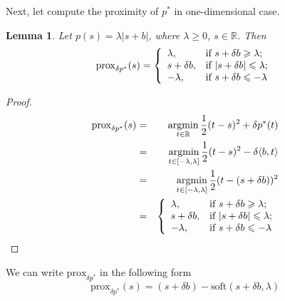 \documentclass[preprint]{elsarticle}
\newtheorem{lemma}{Lemma}
\renewcommand{\le}{\leqslant}
\renewcommand{\ge}{\geqslant}
\renewcommand{\le}{\leqslant}
\renewcommand{\ge}{\geqslant}
\begin{document}
Next, let compute the proximity of $p^*$ in one-dimensional case.
\begin{lemma}
Let $p(s)=\lambda|s+b|$, where $\lambda \ge 0$, $s \in \mathbb{R}$. Then
$$
\mathrm{prox}_{\delta p^*}(s)=\left\{
         \begin{array}{ll}
           \lambda, & \hbox{if $s+\delta b \ge \lambda$;} \\
           s+\delta b, & \hbox{if $|s+\delta b| \le \lambda$;}\\
           -\lambda, & \hbox{if $s+\delta b \le -\lambda$}
         \end{array}
       \right.
$$
\end{lemma}
\begin{proof}\ \
\begin{eqnarray*}
\mathrm{prox}_{\delta p^*}(s)&=&\mathop{\mathrm{argmin}}_{t \in \mathbb{R}} \frac{1}{2}(t-s)^2 + \delta p^*(t) \\
&=&\mathop{\mathrm{argmin}}_{t \in [-\lambda, \lambda]} \frac{1}{2}(t-s)^2  -\delta\langle b, t\rangle \\
&=&\mathop{\mathrm{argmin}}_{t \in [-\lambda, \lambda]} \frac{1}{2}(t-(s+\delta b))^2\\
&=&\left\{
         \begin{array}{ll}
           \lambda, & \hbox{if $s+\delta b \ge \lambda$;} \\
           s+\delta b, & \hbox{if $|s+\delta b| \le \lambda$;}\\
           -\lambda, & \hbox{if $s+\delta b \le -\lambda$}
         \end{array}
       \right.
\end{eqnarray*}
\end{proof}

We can write $\mathrm{prox}_{\delta p^*}$ in the following form
$$
\mathrm{prox}_{\delta p^*}(s) = (s+\delta b)- \mathrm{soft}(s+\delta b, \lambda)
$$
\end{document}
